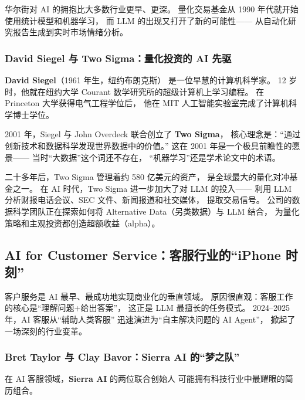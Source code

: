 华尔街对 AI 的拥抱比大多数行业更早、更深。
量化交易基金从 1990 年代就开始使用统计模型和机器学习，
而 LLM 的出现又打开了新的可能性——
从自动化研究报告生成到实时市场情绪分析。

\subsubsection{David Siegel 与 Two Sigma：量化投资的 AI 先驱}

\textbf{David Siegel}（1961 年生，纽约布朗克斯）
是一位早慧的计算机科学家。
12 岁时，他就在纽约大学 Courant 数学研究所的超级计算机上学习编程。
在 Princeton 大学获得电气工程学位后，
他在 MIT 人工智能实验室完成了计算机科学博士学位。

2001 年，Siegel 与 John Overdeck 联合创立了 \textbf{Two Sigma}，
核心理念是：``通过创新技术和数据科学发现世界数据中的价值。''
这在 2001 年是一个极具前瞻性的愿景——
当时``大数据''这个词还不存在，
``机器学习''还是学术论文中的术语。

二十多年后，Two Sigma 管理着约 580 亿美元的资产，
是全球最大的量化对冲基金之一。
在 AI 时代，Two Sigma 进一步加大了对 LLM 的投入——
利用 LLM 分析财报电话会议、SEC 文件、新闻报道和社交媒体，
提取交易信号。
公司的数据科学团队正在探索如何将
Alternative Data（另类数据）与 LLM 结合，
为量化策略和主观投资都创造超额收益（alpha）。


\subsection{AI for Customer Service：客服行业的``iPhone 时刻''}
\label{subsec:customer-service-ai}

客户服务是 AI 最早、最成功地实现商业化的垂直领域。
原因很直观：客服工作的核心是``理解问题+给出答案''，
这正是 LLM 最擅长的任务模式。
2024--2025 年，AI 客服从``辅助人类客服''
迅速演进为``自主解决问题的 AI Agent''，
掀起了一场深刻的行业变革。

\subsubsection{Bret Taylor 与 Clay Bavor：Sierra AI 的``梦之队''}

在 AI 客服领域，\textbf{Sierra AI} 的两位联合创始人
可能拥有科技行业中最耀眼的简历组合。

